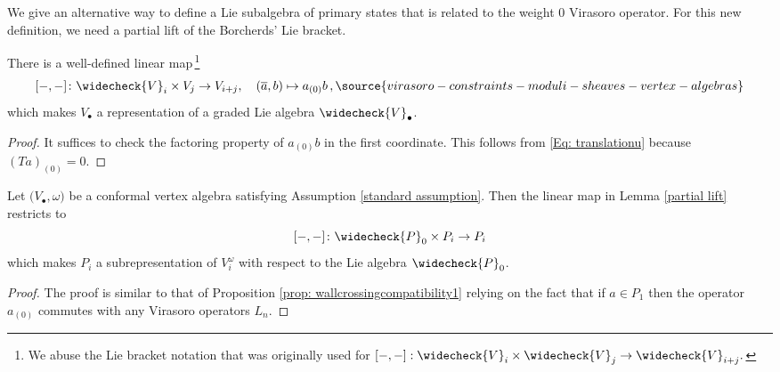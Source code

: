 We give an alternative way to define a Lie subalgebra of primary states that is related to the weight 0 Virasoro operator. For this new definition, we need a partial lift of the Borcherds' Lie bracket.

\begin{lemma}
\notready\label{partial lift}
There is a well-defined linear map\,\footnote{We abuse the Lie bracket notation that was originally used for $[-,-]:\widecheck{V}_i\times \widecheck{V}_j\rightarrow \widecheck{V}_{i+j}.$}
\begin{equation}
\label{Eq: liftofLie}[-,-]\colon \widecheck{V}_{i}\times V_{j}\rightarrow V_{i+j},\quad (\overline{a},b)\mapsto a_{(0)}b\,,
\source{virasoro-constraints-moduli-sheaves-vertex-algebras}
\end{equation}
which makes $V_\bullet$ a representation of a graded Lie algebra $\widecheck{V}_\bullet$.
\end{lemma}
\begin{proof}
It suffices to check the factoring property of $a_{(0)}b$ in the first coordinate. This follows from \eqref{Eq: translationu} because $(Ta)_{(0)}=0$.
\end{proof}

\begin{proposition}
\notready\label{prop: wallcrossingcompatibility2}
Let $\big(V_\bullet,\omega\big)$ be a conformal vertex algebra satisfying Assumption \ref{standard assumption}. Then the linear map in Lemma \ref{partial lift} restricts to
$$[-,-]\colon\widecheck{P}_0\times P_i\rightarrow P_i
$$
which makes $P_i$ a subrepresentation of $V_i^\omega$ with respect to the Lie algebra $\widecheck{P}_0$.
\end{proposition}
\begin{proof}
The proof is similar to that of Proposition \ref{prop: wallcrossingcompatibility1} relying on the fact that if $a\in P_1$ then the operator $a_{(0)}$ commutes with any Virasoro operators $L_n$.
\end{proof}

